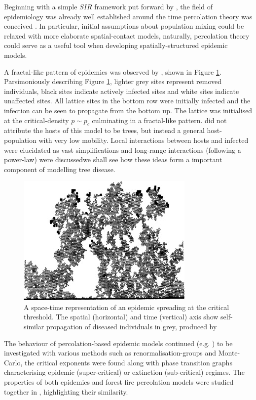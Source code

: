 Beginning with a simple $SIR$ framework put forward by \cite{kermack-model}, the field of epidemiology was already well established around the time percolation theory was conceived \cite{baily1975mathematical}. In particular, initial assumptions about population mixing could be relaxed with more elaborate spatial-contact models, naturally, percolation theory could serve as a useful tool when developing spatially-structured epidemic models.

A fractal-like pattern of epidemics was observed by \cite{GRASSBERGER1986273}, shown in Figure \ref{fig:1d_perc_basis}. Parsimoniously describing Figure \ref{fig:1d_perc_basis}, lighter grey sites represent removed individuals, black sites indicate actively infected sites and white sites indicate unaffected sites. All lattice sites in the bottom row were initially infected and the infection can be seen to propagate from the bottom up. The lattice was initialised at the critical-density $p\sim p_c$ culminating in a fractal-like pattern. \cite{GRASSBERGER1986273} did not attribute the hosts of this model to be trees, but instead a general host-population with very low mobility. Local interactions between hosts and infected were elucidated as vast simplifications and long-range interactions (following a power-law) were discussed\textemdash we shall see how these ideas form a important component of modelling tree disease.

\begin{figure}
    \centering
    \includegraphics{chapter2/figures/perc1.jpg}
    \caption{A space-time representation of an epidemic spreading at the critical threshold. The spatial (horizontal) and time (vertical) axis show self-similar propagation of diseased individuals in grey, produced by \cite{GRASSBERGER1986273}}
    \label{fig:1d_perc_basis}
\end{figure}

The behaviour of percolation-based epidemic models continued (e.g. \cite{pub.1060474189, pub.1059069981}) to be investigated with various methods such as renormalisation-groups and Monte-Carlo, the critical exponents were found along with phase transition graphs characterising epidemic (super-critical) or extinction (sub-critical) regimes. The properties of both epidemics and forest fire percolation models were studied together in \cite{pub.1052857560}, highlighting their similarity.

